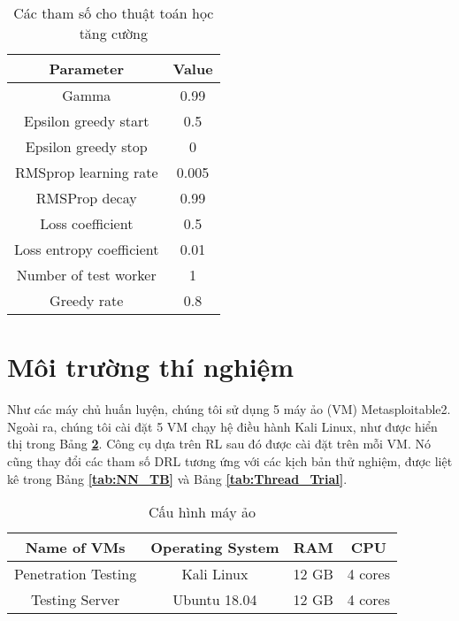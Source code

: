 \begin{table}[!h]
    \centering
    \caption{Các tham số cho thuật toán học tăng cường}
    \label{tab:a3c_parameter}
    \begin{tabular}{|c|c|}
    \hline
    \textbf{Parameter}      & \textbf{Value} \\ 
    \hline
    Gamma                   & 0.99  \\ 
    \hline
    Epsilon greedy start    & 0.5   \\ 
    \hline
    Epsilon greedy stop     & 0     \\ 
    \hline
    RMSprop learning rate   & 0.005 \\ 
    \hline
    RMSProp decay           & 0.99  \\ 
    \hline
    Loss coefficient        & 0.5   \\ 
    \hline
    Loss entropy   coefficient & 0.01  \\ 
    \hline
    Number of test   worker    & 1     \\ 
    \hline
    Greedy rate                & 0.8   \\ 
    \hline
    \end{tabular}
\end{table}



\section{Môi trường thí nghiệm}

Như các máy chủ huấn luyện, chúng tôi sử dụng 5 máy ảo (VM) Metasploitable2. Ngoài ra, chúng tôi cài đặt 5 VM chạy hệ điều hành Kali Linux, như được hiển thị trong Bảng \textbf{\ref{tab:VM_TB}}. Công cụ dựa trên RL sau đó được cài đặt trên mỗi VM. Nó cũng thay đổi các tham số DRL tương ứng với các kịch bản thử nghiệm, được liệt kê trong Bảng \textbf{\ref{tab:NN_TB}} và Bảng \textbf{\ref{tab:Thread_Trial}}. \\

\begin{table}[!h]
    \centering
    \caption{Cấu hình máy ảo}
    \label{tab:VM_TB}
    \begin{tabular}{|c|c|c|c|} \hline
        \textbf{Name of VMs} &\textbf{Operating System} &\textbf{RAM} &\textbf{CPU} \\ 
        \hline
         Penetration Testing &Kali Linux &12 GB &4 cores \\ 
         \hline
        Testing Server &Ubuntu 18.04 &12 GB &4 cores \\ 
        \hline
    \end{tabular}
    
\end{table}


